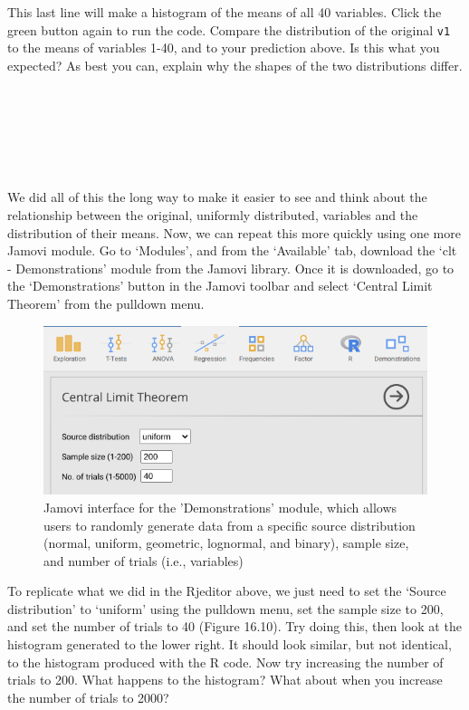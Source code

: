 \documentclass[
]{scrbook}
\begin{document}
This last line will make a histogram of the means of all 40 variables.
Click the green button again to run the code.
Compare the distribution of the original \texttt{v1} to the means of variables 1-40, and to your prediction above.
Is this what you expected?
As best you can, explain why the shapes of the two distributions differ.

\begin{verbatim}






\end{verbatim}

We did all of this the long way to make it easier to see and think about the relationship between the original, uniformly distributed, variables and the distribution of their means.
Now, we can repeat this more quickly using one more Jamovi module.
Go to `Modules', and from the `Available' tab, download the `clt - Demonstrations' module from the Jamovi library.
Once it is downloaded, go to the `Demonstrations' button in the Jamovi toolbar and select `Central Limit Theorem' from the pulldown menu.

\begin{figure}
\includegraphics[width=0.8\linewidth]{img/jamovi_clt} \caption{Jamovi interface for the 'Demonstrations' module, which allows users to randomly generate data from a specific source distribution (normal, uniform, geometric, lognormal, and binary), sample size, and number of trials (i.e., variables)}\label{fig:unnamed-chunk-78}
\end{figure}

To replicate what we did in the Rjeditor above, we just need to set the `Source distribution' to `uniform' using the pulldown menu, set the sample size to 200, and set the number of trials to 40 (Figure 16.10).
Try doing this, then look at the histogram generated to the lower right.
It should look similar, but not identical, to the histogram produced with the R code.
Now try increasing the number of trials to 200.
What happens to the histogram?
What about when you increase the number of trials to 2000?
\end{document}
